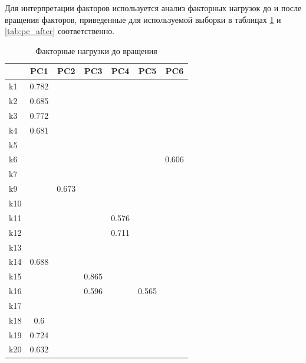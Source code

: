 \documentclass[14pt,a4paper]{extarticle}
\begin{document}
Для интерпретации факторов используется анализ факторных нагрузок до и после вращения факторов, 
приведенные для используемой выборки в таблицах \ref{tab:pc_before} и \ref{tab:pc_after} 
соответственно.

\begin{table}[H]
    \centering
    \caption{Факторные нагрузки до вращения}
    \label{tab:pc_before}
    \small
    \begin{tabular}{l|c|c|c|c|c|c}
        \toprule
        & PC1 & PC2 & PC3 & PC4 & PC5 & PC6 \\
        \midrule
        k1 & 0.782 &       &       &       &       &       \\ 
        \hline
        k2 & 0.685 &       &       &       &       &       \\ 
        \hline
        k3 & 0.772 &       &       &       &       &       \\ 
        \hline
        k4 & 0.681 &       &       &       &       &       \\ 
        \hline
        k5 &       &       &       &       &       &       \\ 
        \hline
        k6 &       &       &       &       &       & 0.606 \\ 
        \hline
        k7 &       &       &       &       &       &       \\ 
        \hline
        k9 &       & 0.673 &       &       &       &       \\ 
        \hline
        k10 &       &       &       &       &       &       \\ 
        \hline
        k11 &       &       &       & 0.576 &       &       \\ 
        \hline
        k12 &       &       &       & 0.711 &       &       \\ 
        \hline
        k13 &       &       &       &       &       &       \\ 
        \hline
        k14 & 0.688 &       &       &       &       &       \\ 
        \hline
        k15 &       &       & 0.865 &       &       &       \\ 
        \hline
        k16 &       &       & 0.596 &       & 0.565 &       \\ 
        \hline
        k17 &       &       &       &       &       &       \\ 
        \hline
        k18 & 0.6 &       &       &       &       &       \\ 
        \hline
        k19 & 0.724 &       &       &       &       &       \\ 
        \hline
        k20 & 0.632 &       &       &       &       &       \\ 
        \bottomrule
    \end{tabular}
\end{table}
\end{document}
